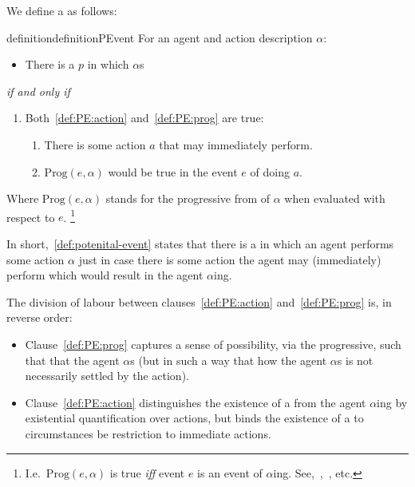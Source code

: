 \begin{note}
  We define a \pevent{} as follows:
  \begin{restatable}[\pevent{3}]{definition}{definitionPEvent}
    \label{def:potenital-event}
    For an agent \vAgent{} and action description \(\alpha\):
    \begin{itemize}
    \item
      There is a \pevent{} \(p\) in which \vAgent{} \(\alpha\)s
    \end{itemize}
    \emph{if and only if}
    \begin{enumerate}[label=]
    \item
      Both~\ref{def:PE:action} and~\ref{def:PE:prog} are true:
      \begin{enumerate}[label=\alph*., ref=(\alph*)]
      \item
        \label{def:PE:action}
        There is some action \(a\) that \vAgent{} may immediately perform.
      \item
        \label{def:PE:prog}
        \(\text{Prog}(e, \alpha)\) would be true in the event \(e\) of \vAgent{} doing \(a\).
      \end{enumerate}
    \end{enumerate}
    Where \(\text{Prog}(e, \alpha)\) stands for the progressive from of \(\alpha\) when evaluated with respect to \(e\).%
    \footnote{
      I.e.\ \(\text{Prog}(e, \alpha)\) is true \emph{iff} event \(e\) is an event of \(\alpha\)ing.
      See,~\textcite{Richards:1981wo},~\textcite{Portner:2011vi}, etc.
    }
  \end{restatable}

  In short,~\autoref{def:potenital-event} states that there is a \pevent{} in which an agent performs some action \(\alpha\) just in case there is some action the agent may (immediately) perform which would result in the agent \(\alpha\)ing.
\end{note}

\begin{note}
  The division of labour between clauses~\ref{def:PE:action} and~\ref{def:PE:prog} is, in reverse order:
  \begin{itemize}[noitemsep]
  \item
    Clause~\ref{def:PE:prog} captures a sense of possibility, via the progressive, such that that the agent \(\alpha\)s (but in such a way that how the agent \(\alpha\)s is not necessarily settled by the action).
\item
  Clause~\ref{def:PE:action} distinguishes the existence of a \pevent{} from the agent \(\alpha\)ing by existential quantification over actions, but binds the existence of a \pevent{} to circumstances be restriction to immediate actions.
  \end{itemize}
\end{note}

